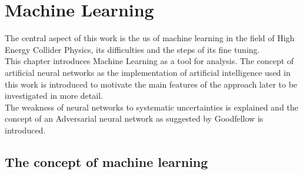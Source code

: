 \section{Machine Learning}

The central aspect of this work is the us of machine learning in the field of High Energy Collider Physics, its difficulties and the steps of its fine tuning.\\
This chapter introduces Machine Learning as a tool for analysis. The concept of artificial neural networks as the implementation of artificial intelligence used in this work is introduced to motivate the main features of the approach later to be investigated in more detail.\\
The weakness of neural networks to systematic uncertainties is explained and the concept of an Adversarial neural network as suggested by Goodfellow is introduced.


\subsection{The concept of machine learning}

